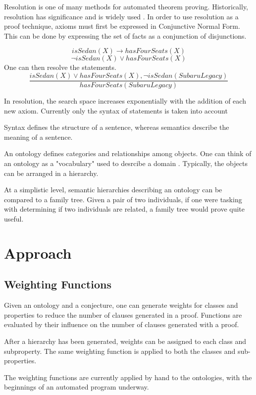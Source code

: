 \documentclass{article}
\begin{document}
Resolution is one of many methods for automated theorem proving. Historically, resolution has significance and is widely used \cite[51]{ertel2018introduction}.
In order to use resolution as a proof technique, axioms must first be expressed in Conjunctive Normal Form. This can be done by expressing the set of facts as a conjunction of disjunctions. 
\begin{singlespace}
		 \[isSedan(X) \rightarrow hasFourSeats(X)\]
		\[\lnot isSedan(X) \lor hasFourSeats(X)\]
		One can then resolve the statements. 
		\[\frac{isSedan(X) \lor hasFourSeats(X), \lnot isSedan(Subaru Legacy)}{hasFourSeats(Subaru Legacy)}\]
\end{singlespace} 
		

In resolution, the search space increases exponentially with the addition of each new axiom. 
Currently only the syntax of statements is taken into account

	

        Syntax defines the structure of a sentence, whereas semantics describe the meaning of a sentence. 
	

		An ontology defines categories and relationships among objects.
		One can think of an ontology as a "vocabulary" used to desrcibe a domain \cite[308]{russell2016artificial}. Typically, the objects can be arranged in a hierarchy. 
		
	At a simplistic level, semantic hierarchies describing an ontology can be compared to a family tree. Given a pair of two individuals, if one were tasking with determining if two individuals are related, a family tree would prove quite useful. 


	\newpage	
	\section{Approach}
		\subsection{Weighting Functions}
Given an ontology and a conjecture, one can generate weights for classes and properties to reduce the number of clauses generated in a proof. Functions are evaluated by their influence on the number of clauses generated with a proof. 

After a hierarchy has been generated, weights can be assigned to each class and subproperty. The same weighting function is applied to both the classes and sub-properties. 

The weighting functions are currently applied by hand to the ontologies, with the beginnings of an automated program underway. 
\end{document}
